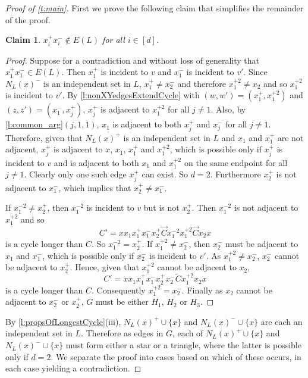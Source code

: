 \documentclass[10pt,a4paper]{amsart}
\newtheorem{claim}{Claim}
\newcommand{\ola}{\overleftarrow{C}}
\newcommand{\ora}{\overrightarrow{C}}
\begin{document}
\begin{proof}[Proof of \cref{t:main}]
First we prove the following claim that simplifies the remainder of the proof.
\begin{claim}\label{cl:xi+xi-}
$x_i^+x_i^- \notin E(L)$ for all $i \in [d]$.
\end{claim}
\begin{proof}
Suppose for a contradiction and without loss of generality that $x_1^+x_1^- \in E(L)$. Then $x_1^+$ is incident to $v$ and $x_1^-$ is incident to $v'$. Since $N_L(x)^-$ is an independent set in $L$, $x_1^+ \neq x_{2}^-$ and therefore $x_1^{+2} \neq x_{2}$ and so $x_1^{+2}$ is incident to $v'$.
By \cref{l:nonXYedgesExtendCycle} with $(w,w')=(x_1^+,x_1^{+2})$ and 
$(z,z')=(x_1^-,x_j^+)$, $x_j^+$ is adjacent to $x_1^{+2}$ for all $j \neq 1$.
Also, by \cref{l:common_arg}$(j,1,1)$, $x_1$ is adjacent to both $x_j^+$ and $x_j^-$ for all $j \neq 1$. 
Therefore, given that $N_L(x)^+$ is an independent set in $L$ and $x_1$ and $x_1^+$ are not adjacent, $x_j^+$ is adjacent to $x$, $x_1$, $x_1^+$ and $x_1^{+2}$, which is possible only if $x_j^+$ is incident to $v$ and is adjacent to both $x_1$ and $x_1^{+2}$ on the same endpoint for all $j\neq 1$. Clearly only one such edge $x_j^+$ can exist. So $d=2$.
Furthermore
$x_{2}^+$ is not adjacent to $x_1^-$, which implies that $x_2^{+}\neq x_{1}^-$.

If $x_1^{-2} \neq x_{2}^+$, then $x_1^{-2}$ is incident to $v$ but is not $x_{2}^+$.
Then $x_1^{-2}$ is not adjacent to $x_1^{+2}$ and so 
\[
C' = xx_1 x_1^+ x_1^- x_{2}^+ \ora x_1^{-2} x_1^{+2} \ora x_2 x 
\]
is a cycle longer than $C$. So $x_1^{-2} = x_{2}^+$.
If $x_1^{+2} \neq x_2^-$, then $x_2^-$ must be adjacent to $x_1$ and $x_1^-$, which is possible only if $x_2^-$ is incident to $v'$. As $x_1^{+2} \neq x_2^-$, $x_2^-$ cannot be adjacent to $x_2^+$. Hence, given that $x_1^{+2}$ cannot be adjacent to $x_2$, 
\[
C' = x x_1 x_1^+ x_1^- x_2^+ x_2^- \ola x_1^{+2} x_2 x
\]
is a cycle longer than $C$. Consequently $ x_1^{+2} = x_2^-$.
Finally as $x_2$ cannot be adjacent to $x_2^-$ or $x_2^+$, $G$ must be either $H_1$, $H_2$ or $H_3$.
\end{proof}
By \cref{l:propsOfLongestCycle}(iii), $N_L(x)^+\cup \{x\}$ and $N_L(x)^-\cup \{x\}$ are each an independent set in $L$. Therefore as edges in $G$, each of $N_L(x)^+ \cup \{x\}$ and $N_L(x)^- \cup \{x\}$ must form either a star or a triangle, where the latter is possible only if $d=2$.
We separate the proof into cases based on which of these occurs, in each case yielding a contradiction.


\end{proof}
\end{document}
